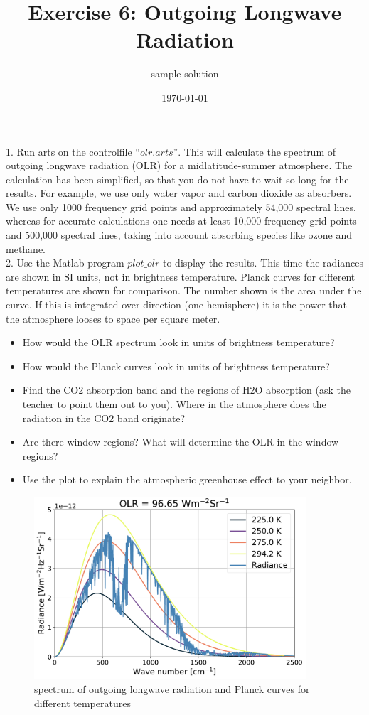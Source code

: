 \documentclass[paper=a4, fontsize=11pt]{scrartcl} %
\title{Exercise 6: Outgoing Longwave Radiation}
\author{sample solution}
\date{\normalsize\today}
\begin{document}
\maketitle

1. Run arts on the controlfile $“olr.arts”$. This will calculate the spectrum of outgoing 
longwave radiation (OLR) for a midlatitude-summer atmosphere. The calculation has been simplified, 
so that you do not have to wait so long for the results. For example, we use only water vapor and 
carbon dioxide as absorbers. We use only 1000 frequency grid points and approximately 54,000 spectral 
lines, whereas for accurate calculations one needs at least 10,000 frequency grid points and 500,000 
spectral lines, taking into account absorbing species like ozone and methane.\ \\

2. Use the Matlab program $plot\_olr$ to display the results. This time the radiances 
are shown in SI units, not in brightness temperature.  Planck curves for different temperatures are 
shown for comparison. The number shown is the area under the curve. If this is integrated over 
direction (one hemisphere) it is the power that the atmosphere looses to space per square meter. \ \\

\begin{itemize}
    \item How would the OLR spectrum look in units of brightness temperature?
    \item How would the Planck curves look in units of brightness temperature?
    \item Find the CO2 absorption band and the regions of H2O absorption (ask the teacher 
        to point them out to you). Where in the atmosphere does the radiation in the CO2 band originate? 
    \item Are there window regions? What will determine the OLR in the window regions?
    \item Use the plot to explain the atmospheric greenhouse effect to your neighbor. \ \\
\end{itemize}

\begin{figure}[h]
\centering
    \includegraphics[width=0.9\textwidth]{plots/olr.pdf}
    \caption{spectrum of outgoing longwave radiation and Planck curves for different temperatures}
\end{figure}
\end{document}
